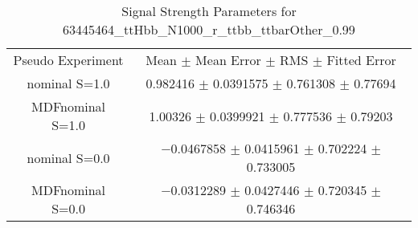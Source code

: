 \begin{table}
\centering
\caption{Signal Strength Parameters for 63445464\_ttHbb\_N1000\_r\_ttbb\_ttbarOther\_0.99}
\begin{tabular}{cc}
\toprule
Pseudo Experiment & Mean $\pm$ Mean Error $\pm$ RMS $\pm$ Fitted Error\\
nominal S=1.0 & \num{0.982416} $\pm$ \num{0.0391575} $\pm$ \num{0.761308} $\pm$ \num{0.77694}\\
MDFnominal S=1.0 & \num{1.00326} $\pm$ \num{0.0399921} $\pm$ \num{0.777536} $\pm$ \num{0.79203}\\
nominal S=0.0 & \num{-0.0467858} $\pm$ \num{0.0415961} $\pm$ \num{0.702224} $\pm$ \num{0.733005}\\
MDFnominal S=0.0 & \num{-0.0312289} $\pm$ \num{0.0427446} $\pm$ \num{0.720345} $\pm$ \num{0.746346}\\
\bottomrule
\end{tabular}
\end{table}